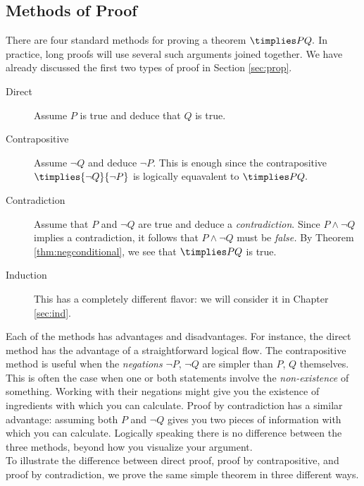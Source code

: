 \newpage










\subsection{Methods of Proof}\label{sec:proof}

There are four standard methods for proving a theorem $\timplies P{Q.}$ In practice, long proofs will use several such arguments joined together. We have already discussed the first two types of proof in Section \ref{sec:prop}.

\begin{description}
	\item[Direct] Assume $P$ is true and deduce that $Q$ is true.
	\item[Contrapositive] Assume $\neg Q$ and deduce $\neg P$. This is enough since the contrapositive $\timplies{\neg Q}{\neg P}$ is logically equavalent to $\timplies P{Q.}$
	\item[Contradiction] Assume that $P$ and $\neg Q$ are true and deduce a \emph{contradiction}. Since $P\wedge\neg Q$ implies a contradiction, it follows that $P\wedge\neg Q$ must be \emph{false.} By Theorem \ref{thm:negconditional}, we see that $\timplies PQ$ is true.
	\item[Induction] This has a completely different flavor: we will consider it in Chapter \ref{sec:ind}.
\end{description}

\noindent Each of the methods has advantages and disadvantages. For instance, the direct method has the advantage of a straightforward logical flow. The contrapositive method is useful when the \emph{negations} $\neg P$, $\neg Q$ are simpler than $P$, $Q$ themselves. This is often the case when one or both statements involve the \emph{non-existence} of something. Working with their negations might give you the existence of ingredients with which you can calculate. Proof by contradiction has a similar advantage: assuming both $P$ and $\neg Q$ gives you two pieces of information with which you can calculate. Logically speaking there is no difference between the three methods, beyond how you visualize your argument.\\

\noindent To illustrate the difference between direct proof, proof by contrapositive, and proof by contradiction, we prove the same simple theorem in three different ways. 


